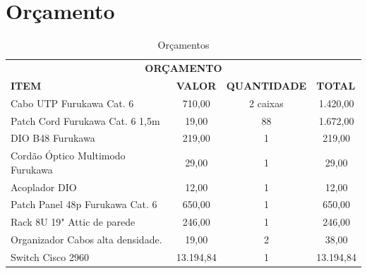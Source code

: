 \documentclass[	DIV=calc,%
							paper=a4,%
							fontsize=12pt,%
							onecolumn]{scrartcl}	 					%
\begin{document}
\section{Orçamento}
\begin{table}[h!]
	\centering
	\caption{Orçamentos}
	\label{orcamentos}
	\begin{tabular}{lccc}
		\multicolumn{4}{c}{\textbf{ORÇAMENTO}}                                                                                                                                             \\
		\textbf{ITEM}                     & \multicolumn{1}{l}{\textbf{VALOR}} & \multicolumn{1}{l}{\textbf{QUANTIDADE}} & \multicolumn{1}{l}{\textbf{TOTAL}}                              \\
		Cabo UTP Furukawa Cat. 6          & 710,00                             & 2 caixas                                & 1.420,00                                                        \\
		Patch Cord Furukawa Cat. 6 1,5m   & 19,00                              & 88                                      & 1.672,00                                                        \\
		DIO B48 Furukawa                  & 219,00                             & 1                                       & 219,00                                                          \\
		Cordão Óptico Multimodo Furukawa  & 29,00                              & 1                                       & 29,00                                                           \\
		Acoplador DIO                     & 12,00                              & 1                                       & 12,00                                                           \\
		Patch Panel 48p Furukawa Cat. 6   & 650,00                             & 1                                       & 650,00                                                          \\
		Rack 8U 19" Attic de parede       & 246,00                             & 1                                       & 246,00                                                          \\
		Organizador Cabos alta densidade. & 19,00                              & 2                                       & 38,00                                                           \\
		Switch Cisco 2960                 & 13.194,84                          & 1                                       & 13.194,84                                                       \\

\end{tabular}
\end{table}
\end{document}
